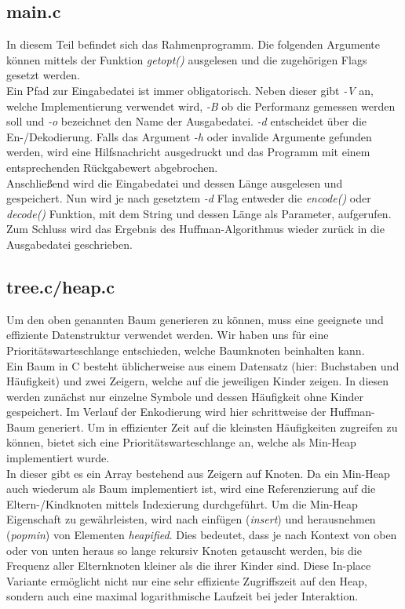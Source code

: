 \documentclass[course=erap]{aspdoc}
\begin{document}
\subsection{main.c}
In diesem Teil befindet sich das Rahmenprogramm. Die folgenden Argumente können mittels der Funktion \textit{getopt()} ausgelesen und die zugehörigen Flags gesetzt werden.\\
Ein Pfad zur Eingabedatei ist immer obligatorisch. Neben dieser gibt \textit{-V} an, welche Implementierung verwendet wird, \textit{-B} ob die Performanz gemessen werden soll und \textit{-o} bezeichnet den Name der Ausgabedatei. \textit{-d} entscheidet über die En-/Dekodierung. Falls das Argument \textit{-h} oder invalide Argumente gefunden werden, wird eine Hilfsnachricht ausgedruckt und das Programm mit einem entsprechenden Rückgabewert abgebrochen.\\
Anschließend wird die Eingabedatei und dessen Länge ausgelesen und gespeichert. Nun wird je nach gesetztem \textit{-d} Flag entweder die \textit{encode()} oder \textit{decode()} Funktion, mit dem String und dessen Länge als Parameter, aufgerufen.
Zum Schluss wird das Ergebnis des Huffman-Algorithmus wieder zurück in die Ausgabedatei geschrieben.

\subsection{tree.c/heap.c}
Um den oben genannten Baum generieren zu können, muss eine geeignete und effiziente Datenstruktur verwendet werden. Wir haben uns für eine Prioritätswarteschlange entschieden, welche Baumknoten beinhalten kann.\\
Ein Baum in C besteht üblicherweise aus einem Datensatz (hier: Buchstaben und Häufigkeit) und zwei Zeigern, welche auf die jeweiligen Kinder zeigen. In diesen werden zunächst nur einzelne Symbole und dessen Häufigkeit ohne Kinder gespeichert. Im Verlauf der Enkodierung wird hier schrittweise der Huffman-Baum generiert. Um in effizienter Zeit auf die kleinsten Häufigkeiten zugreifen zu können, bietet sich eine Prioritätswarteschlange an, welche als Min-Heap implementiert wurde.\\
In dieser gibt es ein Array bestehend aus Zeigern auf Knoten. Da ein Min-Heap auch wiederum als Baum implementiert ist, wird eine Referenzierung auf die Eltern-/Kindknoten mittels Indexierung durchgeführt. Um die Min-Heap Eigenschaft zu gewährleisten, wird nach einfügen (\textit{insert}) und herausnehmen (\textit{pop\textunderscore min}) von Elementen \textit{heapified}. Dies bedeutet, dass je nach Kontext von oben oder von unten heraus so lange rekursiv Knoten getauscht werden, bis die Frequenz aller Elternknoten kleiner als die ihrer Kinder sind. Diese In-place Variante ermöglicht nicht nur eine sehr effiziente Zugriffszeit auf den Heap, sondern auch eine maximal logarithmische Laufzeit bei jeder Interaktion.
\end{document}
